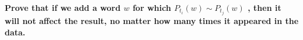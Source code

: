 {\bf Prove that if we add a word $w$ for which $P_{t_i}(w)\sim P_{t_j}(w)$ , then it will not affect the result, no matter how many times it appeared in the data.} 





